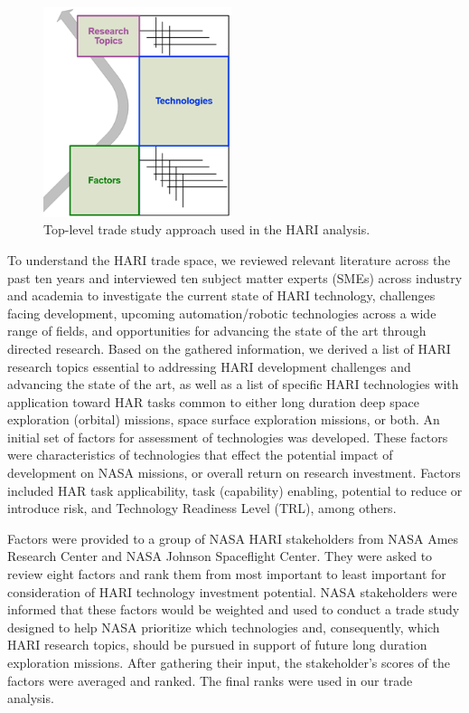 \begin{figure}[b!]
    \begin{center}
        \includegraphics[width=0.49\textwidth]{figures/TradeStudy/figure1.png}
        \caption[Top-level trade study approach used in the HARI analysis]{Top-level trade study approach used in the HARI analysis.}
        \label{figure:tradestudyapproach}
    \end{center}
\end{figure}
To understand the HARI trade space, we reviewed relevant literature across the past ten years and interviewed ten subject matter experts (SMEs) across industry and academia to investigate the current state of HARI technology, challenges facing development, upcoming automation/robotic technologies across a wide range of fields, and opportunities for advancing the state of the art through directed research.
Based on the gathered information, we derived a list of HARI research topics essential to addressing HARI development challenges and advancing the state of the art, as well as a list of specific HARI technologies with application toward HAR tasks common to either long duration deep space exploration (orbital) missions, space surface exploration missions, or both.
An initial set of factors for assessment of technologies was developed.
These factors were characteristics of technologies that effect the potential impact of development on NASA missions, or overall return on research investment.
Factors included HAR task applicability, task (capability) enabling, potential to reduce or introduce risk, and Technology Readiness Level (TRL), among others.

Factors were provided to a group of NASA HARI stakeholders from NASA Ames Research Center and NASA Johnson Spaceflight Center.
They were asked to review eight factors and rank them from most important to least important for consideration of HARI technology investment potential.
NASA stakeholders were informed that these factors would be weighted and used to conduct a trade study designed to help NASA prioritize which technologies and, consequently, which HARI research topics, should be pursued in support of future long duration exploration missions.
After gathering their input, the stakeholder's scores of the factors were averaged and ranked.
The final ranks were used in our trade analysis.

